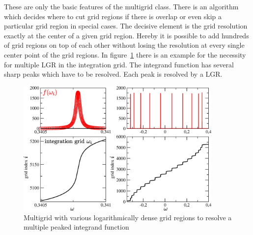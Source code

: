 These are only the basic features of the multigrid class. There is an algorithm which decides where to cut grid regions if there is overlap or even skip a particular grid region in special cases. The decisive element is the grid resolution exactly at the center of a given grid region. Hereby it is possible to add hundreds of grid regions on top of each other without losing the resolution at every single center point of the grid regions. In figure~\ref{fig:multiple_lgr} there is an example for the necessity for multiple LGR in the integration grid. The integrand function has several sharp peaks which have to be resolved. Each peak is resolved by a LGR.
\begin{figure}[h]
	\centering
	\includegraphics[width=0.9\textwidth]{pics/multiple_loggridregions.eps}
	\caption{Multigrid with various logarithmically dense grid regions to resolve a multiple peaked integrand function}
	\label{fig:multiple_lgr}
\end{figure}
